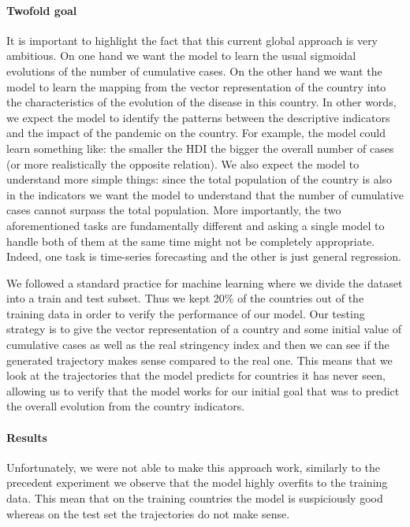 \documentclass[12pt, letterpaper]{article}
\begin{document}
\paragraph{Twofold goal} 
It is important to highlight the fact that this current global approach is very ambitious.
On one hand we want the model to learn the usual sigmoidal evolutions of the number of cumulative cases.
On the other hand we want the model to learn the mapping from the vector representation of the country into the characteristics of the evolution of the disease in this country. 
In other words, we expect the model to identify the patterns between the descriptive indicators and the impact of the pandemic on the country.
For example, the model could learn something like: the smaller the HDI the bigger the overall number of cases (or more realistically the opposite relation). 
We also expect the model to understand more simple things: since the total population of the country is also in the indicators we want the model to understand that the number of cumulative cases cannot surpass the total population. 
More importantly, the two aforementioned tasks are fundamentally different and asking a single model to handle both of them at the same time might not be completely appropriate.
Indeed, one task is time-series forecasting and the other is just general regression.


We followed a standard practice for machine learning where we divide the dataset into a train and test subset. 
Thus we kept 20\% of the countries out of the training data in order to verify the performance of our model.
Our testing strategy is to give the vector representation of a country and some initial value of cumulative cases as well as the real stringency index and then we can see if the generated trajectory makes sense compared to the real one.
This means that we look at the trajectories that the model predicts for countries it has never seen, allowing us to verify that the model works for our initial goal that was to predict the overall evolution from the country indicators.

\paragraph{Results} 
Unfortunately, we were not able to make this approach work, similarly to the precedent experiment we observe that the model highly overfits to the training data.
This mean that on the training countries the model is suspiciously good whereas on the test set the trajectories do not make sense. 
\end{document}
